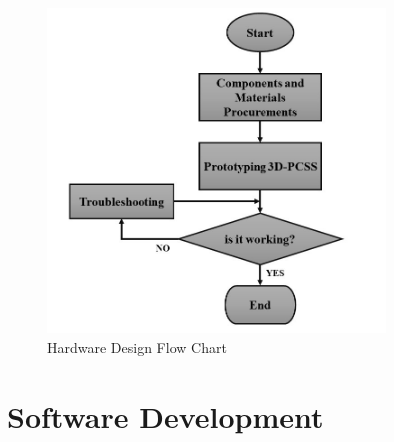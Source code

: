 \begin{figure}[H]
	\centering
	\includegraphics[width=0.8\textwidth]{Figures/hardware_flowchart}
	\caption{Hardware Design Flow Chart}
	\label{ch3:fig:3d-pcss_development_flow_chart}
\end{figure}



\section{Software Development}
\label{ch3:sec:firmware_development_design}

